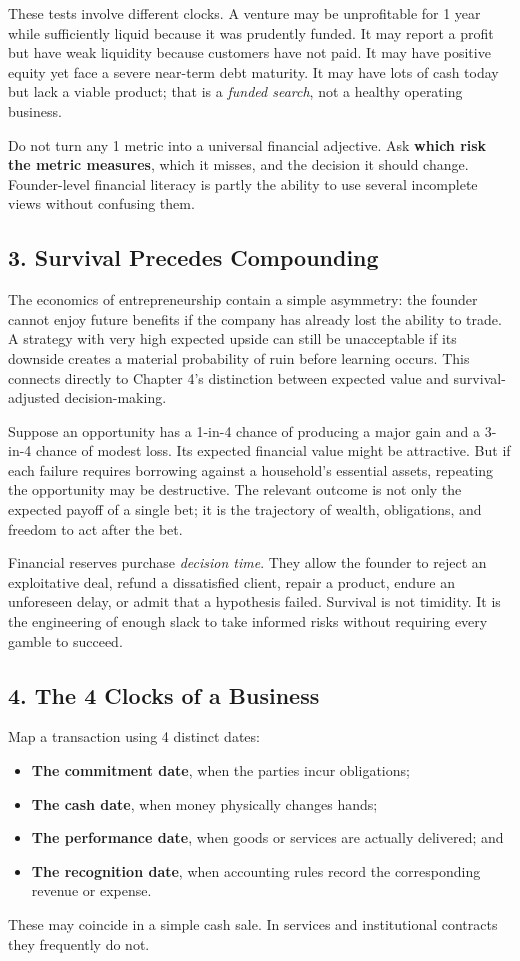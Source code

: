 These tests involve different clocks. A venture may be unprofitable for 1 year while sufficiently liquid because it was prudently funded. It may report a profit but have weak liquidity because customers have not paid. It may have positive equity yet face a severe near-term debt maturity. It may have lots of cash today but lack a viable product; that is a \emph{funded search}, not a healthy operating business.

Do not turn any 1 metric into a universal financial adjective. Ask \textbf{which risk the metric measures}, which it misses, and the decision it should change. Founder-level financial literacy is partly the ability to use several incomplete views without confusing them.

\subsection*{3. Survival Precedes Compounding}

The economics of entrepreneurship contain a simple asymmetry: the founder cannot enjoy future benefits if the company has already lost the ability to trade. A strategy with very high expected upside can still be unacceptable if its downside creates a material probability of ruin before learning occurs. This connects directly to Chapter 4's distinction between expected value and survival-adjusted decision-making.

Suppose an opportunity has a 1-in-4 chance of producing a major gain and a 3-in-4 chance of modest loss. Its expected financial value might be attractive. But if each failure requires borrowing against a household's essential assets, repeating the opportunity may be destructive. The relevant outcome is not only the expected payoff of a single bet; it is the trajectory of wealth, obligations, and freedom to act after the bet.

Financial reserves purchase \emph{decision time}. They allow the founder to reject an exploitative deal, refund a dissatisfied client, repair a product, endure an unforeseen delay, or admit that a hypothesis failed. Survival is not timidity. It is the engineering of enough slack to take informed risks without requiring every gamble to succeed.

\subsection*{4. The 4 Clocks of a Business}

Map a transaction using 4 distinct dates:
\begin{itemize}
\item \textbf{The commitment date}, when the parties incur obligations;
\item \textbf{The cash date}, when money physically changes hands;
\item \textbf{The performance date}, when goods or services are actually delivered; and
\item \textbf{The recognition date}, when accounting rules record the corresponding revenue or expense.
\end{itemize}
These may coincide in a simple cash sale. In services and institutional contracts they frequently do not.

